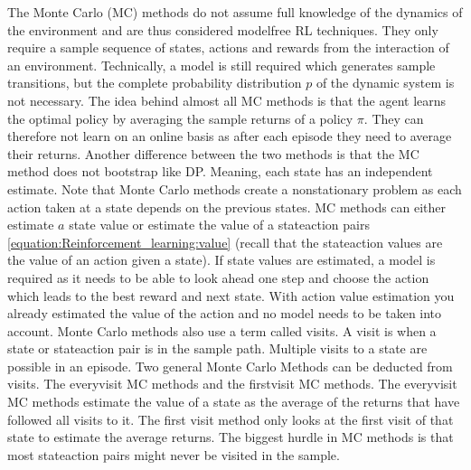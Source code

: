 \documentclass[letterpaper,10pt,english]{jupyterBook}
\begin{document}
\sphinxAtStartPar
The Monte Carlo (MC) methods do not assume full knowledge of the dynamics of the environment and are thus considered model\sphinxhyphen{}free RL techniques. They only require a sample sequence of states, actions and rewards from the interaction of an environment. Technically, a model is still required which generates sample transitions, but the complete probability distribution \(p\) of the dynamic system is not necessary. The idea behind almost all MC methods is that the agent learns the optimal policy by averaging the sample returns of a policy \(\pi\). They can therefore not learn on an online basis as after each episode they need to average their returns. Another difference between the two methods is that the MC method does not bootstrap like DP. Meaning, each state has an independent estimate. Note that Monte Carlo methods create a nonstationary problem as each action taken at a state depends on the previous states. MC methods can either estimate \(a\) state value  or estimate the value of a state\sphinxhyphen{}action pairs \eqref{equation:Reinforcement_learning:value} (recall that the state\sphinxhyphen{}action values are the value of an action given a state). If state values are estimated, a model is required as it needs to be able to look ahead one step and choose the action which leads to the best reward and next state. With action value estimation you already estimated the value of the action and no model needs to be taken into account.  Monte Carlo methods also use a term called visits. A visit is when a state or state\sphinxhyphen{}action pair is in the sample path. Multiple visits to a state are possible in an episode. Two general Monte Carlo Methods can be deducted from visits. The every\sphinxhyphen{}visit MC methods and the first\sphinxhyphen{}visit MC methods. The every\sphinxhyphen{}visit MC methods estimate the value of a state as the average of the returns that have followed all visits to it. The first visit method only looks at the first visit of that state to estimate the average returns. The biggest hurdle in MC methods is that most state\sphinxhyphen{}action pairs might never be visited in the sample.
\end{document}
